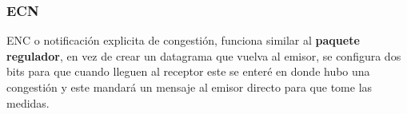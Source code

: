 \documentclass[12pt,fleqn,a4paper,oneside]{LegrandOrangeBook}
\begin{document}
\subsubsection{ECN}
ENC o notificación explicita de congestión, funciona similar al \textbf{paquete regulador}, en vez de crear un datagrama que vuelva al emisor, se configura dos bits para que cuando lleguen al receptor este se enteré en donde hubo una congestión y este mandará un mensaje al emisor directo para que tome las medidas.


\end{document}
